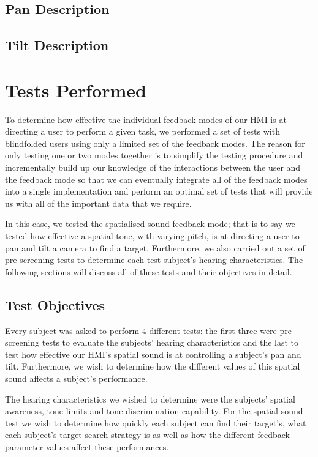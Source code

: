 \documentclass[format=sigconf, review=true, screen=true, anonymous=true]{acmart}
\begin{document}
\subsection{Pan Description}

\subsection{Tilt Description}

\section{Tests Performed}

To determine how effective the individual feedback modes of our HMI is at directing a user to perform a given task, we performed a set of tests with blindfolded users using only a limited set of the feedback modes. The reason for only testing one or two modes together is to simplify the testing procedure and incrementally build up our knowledge of the interactions between the user and the feedback mode so that we can eventually integrate all of the feedback modes into a single implementation and perform an optimal set of tests that will provide us with all of the important data that we require. 

In this case, we tested the spatialised sound feedback mode; that is to say we tested how effective a spatial tone, with varying pitch, is at directing a user to pan and tilt a camera to find a target. Furthermore, we also carried out a set of pre-screening tests to determine each test subject's hearing characteristics. The following sections will discuss all of these tests and their objectives in detail. 

\subsection{Test Objectives}

Every subject was asked to perform 4 different tests: the first three were pre-screening tests to evaluate the subjects' hearing characteristics and the last to test how effective our HMI's spatial sound is at controlling a subject's pan and tilt. Furthermore, we wish to determine how the different values of this spatial sound affects a subject's performance. 

The hearing characteristics we wished to determine were the subjects' spatial awareness, tone limits and tone discrimination capability. For the spatial sound test we wish to determine how quickly each subject can find their target's, what each subject's target search strategy is as well as how the different feedback parameter values affect these performances. 
\end{document}

